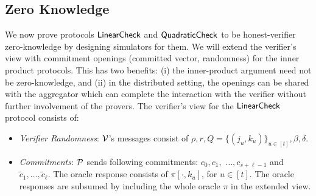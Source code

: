 \subsection{Zero Knowledge}
We now prove protocols $\mathsf{LinearCheck}$ and $\mathsf{QuadraticCheck}$ to be honest-verifier
zero-knowledge by designing simulators for them. We will extend the verifier's
view with commitment openings (committed vector, randomness) for the inner
product protocols. This has two benefits: (i) the inner-product argument need
not be zero-knowledge, and (ii) in the distributed setting, the openings can be
shared with the aggregator which can complete the interaction with the verifier
without further involvement of the provers. The verifier's view for
the $\mathsf{LinearCheck}$ protocol consists of:
\begin{itemize} %
\item {\em Verifier Randomness}: $\mathcal{V}$'s messages consist of $\rho, r, Q = \{(j_u,k_u)\}_{u\in [t]}, \beta, \delta$.

\item {\em Commitments}: $\mathcal{P}$ sends following commitments: $c_0, c_1,$
$\ldots, c_{s+\ell-1}$ and $\tilde{c}_1,\ldots, \tilde{c}_{\ell}$. The oracle
response consists of  $\pi[\cdot,k_u]$, for $u\in [t]$. The oracle
responses are subsumed by including the whole oracle $\pi$ in the extended view.


\end{itemize}
